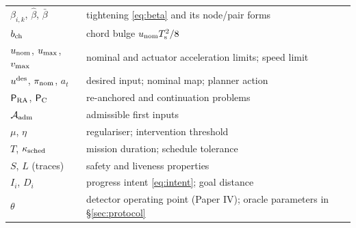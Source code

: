 \begin{table}[h]
\begin{tabularx}{\columnwidth}{@{}l>{\raggedright\arraybackslash}X@{}}
$\beta_{i,k}$, $\hat\beta$, $\bar\beta$ & tightening \eqref{eq:beta} and its node/pair forms\\
$b_{\mathrm{ch}}$ & chord bulge $u_{\mathrm{nom}}T_{\mathrm{s}}^2/8$\\
$u_{\mathrm{nom}}$, $u_{\max}$, $v_{\max}$ & nominal and actuator acceleration limits; speed limit\\
$u^{\mathrm{des}}$, $\pi_{\mathrm{nom}}$, $a_t$ & desired input; nominal map; planner action\\
$\mathsf{P}_{\mathrm{RA}}$, $\mathsf{P}_{\mathrm{C}}$ & re-anchored and continuation problems\\
$\mathcal{A}_{\mathrm{adm}}$ & admissible first inputs\\
$\mu$, $\eta$ & regulariser; intervention threshold\\
$T$, $\kappa_{\mathrm{sched}}$ & mission duration; schedule tolerance\\
$S$, $L$ (traces) & safety and liveness properties\\
$I_i$, $D_i$ & progress intent \eqref{eq:intent}; goal distance\\
$\theta$ & detector operating point (Paper IV); oracle parameters in \S\ref{sec:protocol}\\
\bottomrule
\end{tabularx}
\end{table}

